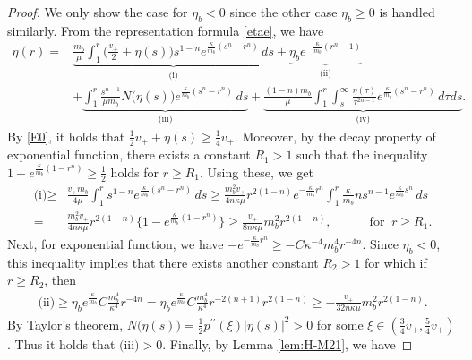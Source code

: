 \documentclass[a4paper,12pt,draft]{article}
\theoremstyle{remark}
\begin{document}
\begin{proof}
    We only show the case for $\eta_b<0$ since the other case $\eta_b\ge 0$ is handled similarly. From the representation formula \eqref{etae}, we have
    \begin{align*}
        \eta(r) =& \underbrace{\frac{m_b}{\mu}\int_{1}^r \!\!\big( \frac{v_+}{2} + \eta(s) \big) s^{1-n} e^{\frac{\kappa}{m_b}(s^n-r^n)}\, ds}_{\textrm{(i)}} + \underbrace{\eta_b e^{-\frac{\kappa}{m_b}(r^n-1)}}_{\textrm{(ii)}}\\
        &+ \underbrace{\int_{1}^{r}\frac{s^{n-1}}{\mu m_b}N\big(\eta(s)\big) e^{\frac{\kappa}{m_b}(s^n-r^n)} \,ds}_{\textrm{(iii)}} + \underbrace{\frac{(1-n)m_b}{\mu} \int_{1}^r\int_{s}^{\infty} \frac{\eta(\tau)}{\tau^{2n-1}} e^{\frac{\kappa}{m_b}(s^n-r^n)}\, d\tau ds}_{\textrm{(iv)}}.
    \end{align*}
    By \eqref{E0}, it holds that $\frac{1}{2}v_{+} + \eta(s) \ge \frac{1}{4}v_{+}$. Moreover, by the decay property of exponential function, there exists a constant $R_1 > 1$ such that the inequality $1-e^{\frac{\kappa}{m_b}(1-r^n)} \ge \frac{1}{2}$ holds for $r\ge R_1$. Using these, we get
    \begin{align*}
        \textrm{(i)} \ge& \frac{v_{+}m_b}{4\mu} \int_{1}^{r} s^{1-n} e^{\frac{\kappa}{m_b}(s^n-r^n)}\, ds  %
        \ge \frac{m_b^2 v_{+}}{4n\kappa \mu} r^{2(1-n)} e^{-\frac{\kappa}{m_b}r^n} \int_{1}^r \frac{\kappa}{m_b} n s^{n-1} e^{\frac{\kappa}{m_b}s^n}\, ds\\
        =& \frac{m_b^2 v_{+}}{4n\kappa \mu} r^{2(1-n)} \big\{1- e^{\frac{\kappa}{m_b}(1-r^n)}\big\} \ge \frac{v_{+}}{8n\kappa \mu} m_b^2 r^{2(1-n)}, \quad\qquad \text{for } \ r\ge R_1.
    \end{align*}
    Next, for exponential function, we have $- e^{-\frac{\kappa}{m_b}r^n} \ge - C \kappa^{-4} m_b^4 r^{-4n}$. Since $\eta_b<0$, this inequality implies that there exists another constant $R_2>1$ for which if $r\ge R_2$, then
    \begin{align*}
        \textrm{(ii)} \ge \eta_b e^{\frac{\kappa}{m_b}} C \frac{m_b^4}{\kappa^4} r^{-4n} = 
        \eta_b e^{\frac{\kappa}{m_b}} C \frac{m_b^4}{\kappa^4} r^{-2(n+1)} r^{2(1-n)} \ge - \frac{v_{+}}{32n\kappa \mu} m_b^2 r^{2(1-n)}. 
    \end{align*}
    By Taylor's theorem, $ N\big(\eta(s)\big) = \frac{1}{2} p^{\prime\prime}(\xi) |\eta(s)|^2 >0$ for some $\xi\in (\frac{3}{4}v_{+}, \frac{5}{4}v_{+})$. Thus it holds that $\textrm{(iii)} >0$. Finally, by Lemma \ref{lem:H-M21}, we have

\end{proof}
\end{document}
